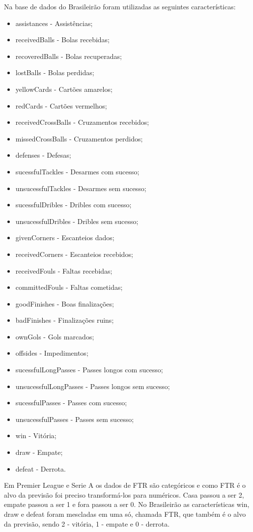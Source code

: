 	Na base de dados do Brasileirão foram utilizadas as seguintes características:
	\begin{itemize}
	\item assistances - Assistências;
	\item receivedBalls - Bolas recebidas;
	\item recoveredBalls - Bolas recuperadas;
	\item lostBalls - Bolas perdidas;
	\item yellowCards - Cartões amarelos;
	\item redCards - Cartões vermelhos;
	\item receivedCrossBalls - Cruzamentos recebidos;
	\item missedCrossBalls - Cruzamentos perdidos;
	\item defenses - Defesas;
	\item sucessfulTackles - Desarmes com sucesso;
	\item unsucessfulTackles - Desarmes sem sucesso;
	\item sucessfulDribles - Dribles com sucesso;
	\item unsucessfulDribles - Dribles sem sucesso;
	\item givenCorners - Escanteios dados;
	\item receivedCorners - Escanteios recebidos;
	\item receivedFouls - Faltas recebidas;
	\item committedFouls - Faltas cometidas;
	\item goodFinishes - Boas finalizações;
	\item badFinishes - Finalizações ruins;
	\item ownGols - Gols marcados;
	\item offsides - Impedimentos;
	\item sucessfulLongPasses - Passes longos com sucesso;
	\item unsucessfulLongPasses - Passes longos sem sucesso;
	\item sucessfulPasses - Passes com sucesso;
	\item unsucessfulPasses - Passes sem sucesso;
	\item win - Vitória;
	\item draw - Empate;
	\item defeat - Derrota.
	\end{itemize}

	Em Premier League e Serie A os dados de FTR são categóricos e como FTR é o alvo da previsão foi preciso transformá-los para numéricos. Casa passou a ser 2, empate passou a ser 1 e fora passou a ser 0. No Brasileirão as características win, draw e defeat foram mescladas em uma só, chamada FTR, que também é o alvo da previsão, sendo 2 - vitória, 1 - empate e 0 - derrota.
	
